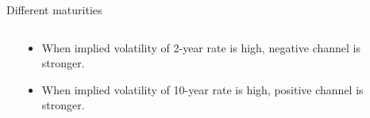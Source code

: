 \documentclass{beamer}
\begin{document}
\begin{frame}{Different maturities}
\begin{columns}
\begin{column}{0.6\textwidth}
\end{column}
\begin{column}{0.5\textwidth}  %
\begin{itemize}
    \item When implied volatility of 2-year rate is high, negative channel is stronger.
    \vspace{0.5cm}
    \item When implied volatility of 10-year rate is high, positive channel is stronger.
\end{itemize}
\end{column}
\end{columns}    
\end{frame}
\end{document}
